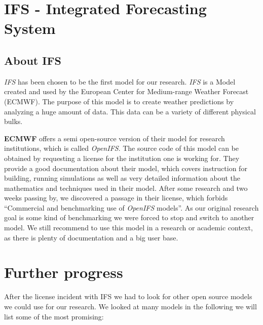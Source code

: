 \documentclass[]{article}
\begin{document}
\pagebreak

\section{IFS - Integrated Forecasting
System}\label{ifs---integrated-forecasting-system}

\subsection{About IFS}\label{about-ifs}

\emph{IFS} has been chosen to be the first model for our research.
\emph{IFS} is a Model created and used by the European Center for
Medium-range Weather Forecast (ECMWF). The purpose of this model is to
create weather predictions by analyzing a huge amount of data. This data
can be a variety of different physical bulks. \cite{ifs}

\textbf{ECMWF} offers a semi open-source version of their model for
research institutions, which is called \emph{OpenIFS}. The source code
of this model can be obtained by requesting a license for the
institution one is working for. They provide a good documentation about
their model, which covers instruction for building, running simulations
as well as very detailed information about the mathematics and
techniques used in their model. After some research and two weeks
passing by, we discovered a passage in their license, which forbids
``Commercial and benchmarking use of \emph{OpenIFS} models''. As our
original research goal is some kind of benchmarking we were forced to
stop and switch to another model. We still recommend to use this model
in a research or academic context, as there is plenty of documentation
and a big user base.

\pagebreak

\section{Further progress}\label{further-progress}

After the license incident with IFS we had to look for other open source
models we could use for our research. We looked at many models in the
following we will list some of the most promising:
\end{document}
